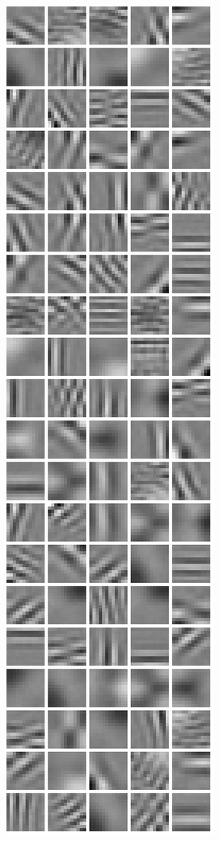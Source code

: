 {\begin{figure}
\begin{subfigure}[b]{0.2\textwidth}
\includegraphics[width=\x, height=\y]{./figures/SATAE/patches_sat_linear_full.png}
\caption{} \end{subfigure} \\ \begin{subfigure}[b]{0.225\textwidth} \centering

\end{subfigure}
\end{figure}}
